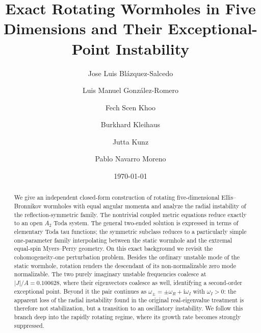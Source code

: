 \documentclass[aps,prl,reprint,superscriptaddress,nofootinbib,floatfix]{revtex4-2}
\newcommand{\ii}{\mathrm i}
\begin{document}
\title{Exact Rotating Wormholes in Five Dimensions and Their Exceptional-Point Instability}

\author{Jose Luis Bl\'azquez-Salcedo}

\author{Luis Manuel Gonz\'alez-Romero}

\author{Fech Scen Khoo}

\author{Burkhard Kleihaus}

\author{Jutta Kunz}

\author{Pablo Navarro Moreno}





\date{\today}

\begin{abstract}
We give an independent closed-form construction of rotating five-dimensional Ellis--Bronnikov wormholes with equal angular momenta and analyze the radial instability of the reflection-symmetric family.  
The nontrivial coupled metric equations reduce exactly to an open $A_2$ Toda system. 
The general two-ended solution is expressed in terms of elementary Toda tau functions; the symmetric subclass reduces to a particularly simple one-parameter family interpolating between the static wormhole and the extremal equal-spin Myers--Perry geometry.  
On this exact background we revisit the cohomogeneity-one perturbation problem.  
Besides the ordinary unstable mode of the static wormhole, rotation renders the descendant of its non-normalizable zero mode normalizable.  
The two purely imaginary unstable frequencies coalesce at $|J|/A=0.100628$, where their eigenvectors coalesce as well, identifying a second-order exceptional point.  
Beyond it the pair continues as $\omega_\pm=\pm\omega_R+\ii\omega_I$ with $\omega_I>0$: 
the apparent loss of the radial instability found in the original real-eigenvalue treatment
is therefore not stabilization, but a transition to an oscillatory instability.  
We follow this branch deep into the rapidly rotating regime, where its growth rate becomes
strongly suppressed.  
\end{abstract}
\end{document}

